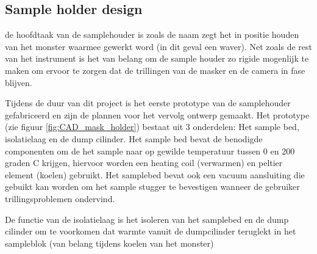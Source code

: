 \documentclass[11pt]{article}
\begin{document}
\subsection{Sample holder design}

de hoofdtaak van de samplehouder is zoals de naam zegt het in positie houden van het monster waarmee gewerkt word (in dit geval een waver). Net zoals de rest van het instrument is het van belang om de sample houder zo rigide mogenlijk te maken om ervoor te zorgen dat de trillingen van de masker en de camera in fase blijven.

Tijdens de duur van dit project is het eerste prototype van de samplehouder gefabriceerd en zijn de plannen voor het vervolg ontwerp gemaakt. Het prototype (zie figuur \ref{fig:CAD_mask_holder}) bestaat uit 3 onderdelen: Het sample bed, isolatielaag en de dump cilinder. Het sample bed bevat de benodigde componenten om de het sample naar op gewilde temperatuur tussen 0 en 200 graden C krijgen, hiervoor worden een heating coil (verwarmen) en peltier element (koelen) gebruikt. Het samplebed bevat ook een vacuum aansluiting die gebuikt kan worden om het sample stugger te bevestigen wanneer de gebruiker trillingsproblemen ondervind. 

De functie van de isolatielaag is het isoleren van het samplebed en de dump cilinder om te voorkomen dat warmte vanuit de dumpcilinder teruglekt in het sampleblok (van belang tijdens koelen van het monster)

\end{document}
